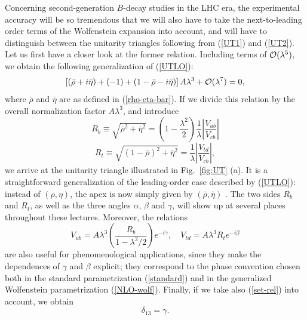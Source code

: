 \documentclass[11pt]{cernrep}
\begin{document}
Concerning second-generation $B$-decay studies in the LHC era, 
the experimental accuracy will be so tremendous that we will also have 
to take the next-to-leading order terms of the Wolfenstein expansion
into account, and will have to distinguish between the unitarity triangles 
following from (\ref{UT1}) and (\ref{UT2}). Let us first have a closer
look at the former relation. Including terms of ${\cal O}(\lambda^5)$, 
we obtain the following generalization of (\ref{UTLO}):
\begin{equation}\label{UT1-NLO}
\left[(\bar\rho+i\bar\eta)+(-1)+(1-\bar\rho-
i\bar\eta)\right]A\lambda^3 +{\cal O}(\lambda^7)=0, 
\end{equation}
where $\bar\rho$ and $\bar\eta$ are as defined in (\ref{rho-eta-bar}). 
If we divide this relation by the overall normalization factor $A\lambda^3$, 
and introduce
\begin{equation}\label{Rb-def}
R_b\equiv\sqrt{\overline{\rho}^2+\overline{\eta}^2}=\left(1-\frac{\lambda^2}{2}
\right)\frac{1}{\lambda}\left|\frac{V_{ub}}{V_{cb}}\right|
\end{equation}
\begin{equation}\label{Rt-def}
R_t\equiv\sqrt{(1-\overline{\rho})^2+\overline{\eta}^2}=
\frac{1}{\lambda}\left|\frac{V_{td}}{V_{cb}}\right|,
\end{equation}
we arrive at the unitarity triangle illustrated in Fig.\ \ref{fig:UT} (a). 
It is a straightforward generalization of the leading-order
case described by (\ref{UTLO}): instead of $(\rho,\eta)$, the apex
is now simply given by $(\bar\rho,\bar\eta)$ \cite{blo}. The two sides 
$R_b$ and $R_t$, as well as the three angles $\alpha$, $\beta$ and $\gamma$, 
will show up at several places throughout these lectures. Moreover, the 
relations
\begin{equation}
V_{ub}=A\lambda^3\left(\frac{R_b}{1-\lambda^2/2}\right)e^{-i\gamma},\quad 
V_{td}=A\lambda^3 R_t e^{-i\beta}
\end{equation}
are also useful for phenomenological applications, since they make the
dependences of $\gamma$ and $\beta$ explicit; they correspond to the
phase convention chosen both in the standard parametrization 
(\ref{standard}) and in the generalized Wolfenstein parametrization 
(\ref{NLO-wolf}). Finally, if we take also (\ref{set-rel}) into account, 
we obtain
\begin{equation}
\delta_{13}=\gamma.
\end{equation}
\end{document}

